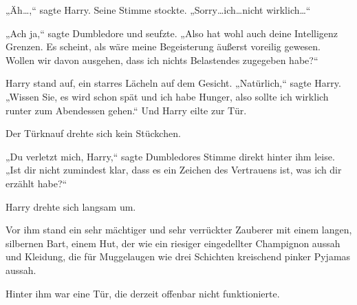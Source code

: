 „Äh…,“ sagte Harry. Seine Stimme stockte. „Sorry…ich…nicht wirklich…“

„Ach ja,“ sagte Dumbledore und seufzte. „Also hat wohl auch deine Intelligenz Grenzen. Es scheint, als wäre meine Begeisterung äußerst voreilig gewesen. Wollen wir davon ausgehen, dass ich nichts Belastendes zugegeben habe?“

Harry stand auf, ein starres Lächeln auf dem Gesicht. „Natürlich,“ sagte Harry. „Wissen Sie, es wird schon spät und ich habe Hunger, also sollte ich wirklich runter zum Abendessen gehen.“ Und Harry eilte zur Tür.

Der Türknauf drehte sich kein Stückchen.

„Du verletzt mich, Harry,“ sagte Dumbledores Stimme direkt hinter ihm leise. „Ist dir nicht zumindest klar, dass es ein Zeichen des Vertrauens ist, was ich dir erzählt habe?“

Harry drehte sich langsam um.

Vor ihm stand ein sehr mächtiger und sehr verrückter Zauberer mit einem langen, silbernen Bart, einem Hut, der wie ein riesiger eingedellter Champignon aussah und Kleidung, die für Muggelaugen wie drei Schichten kreischend pinker Pyjamas aussah.

Hinter ihm war eine Tür, die derzeit offenbar nicht funktionierte.


